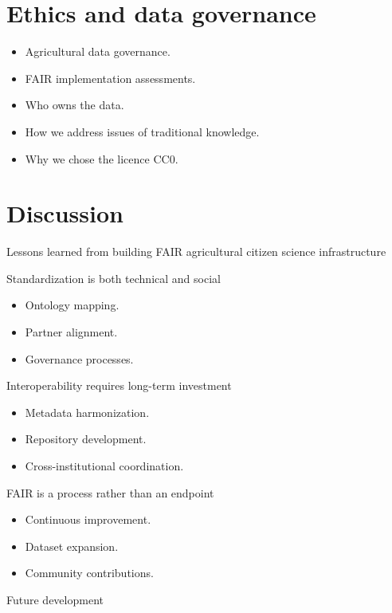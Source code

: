 \documentclass[3p]{elsarticle} %
\providecommand{\tightlist}{%
  \setlength{\itemsep}{0pt}\setlength{\parskip}{0pt}}
\begin{document}
\section{Ethics and data governance}\label{ethics-and-data-governance}

\begin{itemize}
\tightlist
\item
  Agricultural data governance.
\item
  FAIR implementation assessments.
\item
  Who owns the data.
\item
  How we address issues of traditional knowledge.
\item
  Why we chose the licence CC0.
\end{itemize}

\section{Discussion}\label{discussion}

Lessons learned from building FAIR agricultural citizen science
infrastructure

Standardization is both technical and social

\begin{itemize}
\tightlist
\item
  Ontology mapping.
\item
  Partner alignment.
\item
  Governance processes.
\end{itemize}

Interoperability requires long-term investment

\begin{itemize}
\tightlist
\item
  Metadata harmonization.
\item
  Repository development.
\item
  Cross-institutional coordination.
\end{itemize}

FAIR is a process rather than an endpoint

\begin{itemize}
\tightlist
\item
  Continuous improvement.
\item
  Dataset expansion.
\item
  Community contributions.
\end{itemize}

Future development
\end{document}
